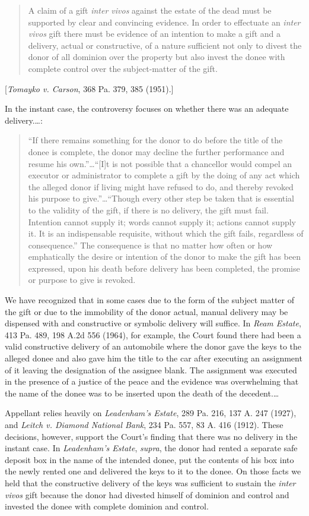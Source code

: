 \begin{quote}
A claim of a gift \textit{inter vivos} against the estate of the dead must be
supported by clear and convincing evidence. In order to effectuate an
\textit{inter vivos} gift there must be evidence of an intention to make a gift
and a delivery, actual or constructive, of a nature sufficient not only to
divest the donor of all dominion over the property but also invest the donee
with complete control over the subject-matter of the gift.
\end{quote}
[\emph{Tomayko v. Carson}, 368 Pa. 379, 385 (1951).]

In the instant case, the controversy focuses on whether there was an adequate
delivery.\dots :
\begin{quote}
``If there remains something for the donor to do before the title of the
donee is complete, the donor may decline the further performance and resume his
own.''\dots ``[I]t is not possible that a chancellor would compel an executor
or administrator to complete a gift by the doing of any act which the alleged
donor if living might have refused to  do, and thereby revoked his purpose to
give.''\dots ``Though every other step be taken that is essential to the
validity of the gift, if there is no delivery, the gift must fail. Intention
cannot supply it; words cannot supply it; actions cannot supply it. It is an
indispensable requisite, without which the gift fails, regardless of
consequence.'' The consequence is that no matter how often or how emphatically
the desire or intention of the donor to make the gift has been expressed, upon
his death before delivery has been completed, the promise or purpose to give is
revoked. 
\end{quote}

We have recognized that in some cases due to the form of the subject matter of
the gift or due to the immobility of the donor actual, manual delivery may be
dispensed with and constructive or symbolic delivery will suffice. In \emph{Ream
Estate}, 413 Pa. 489, 198 A.2d 556 (1964), for example, the Court found there
had been a valid constructive delivery of an automobile where the donor gave
the keys to the alleged donee and also gave him the title to the car after
executing an assignment of it leaving the designation of the assignee blank.
The assignment was executed in the presence of a justice of the peace and the
evidence was overwhelming that the name of the donee was to be inserted upon
the death of the decedent.\dots

Appellant relies heavily on \emph{Leadenham's Estate}, 289 Pa. 216, 137 A. 247 (1927),
and \emph{Leitch v. Diamond National Bank}, 234 Pa. 557, 83 A. 416 (1912). These
decisions, however, support the Court's finding that there was no delivery in
the instant case. In \emph{Leadenham's Estate}, \emph{supra}, the donor had
rented a separate
safe deposit box in the name of the intended donee, put the contents of his box
into the newly rented one and delivered the keys to it to the donee. On those
facts we held that the constructive delivery of the keys was sufficient to
sustain the \textit{inter vivos} gift because the donor had divested himself of
dominion and control and invested the donee with complete dominion and control.

